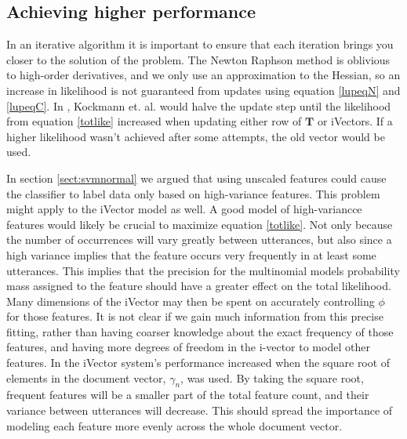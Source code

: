 \subsection{Achieving higher performance}

In an iterative algorithm it is important to ensure that each iteration brings you closer to the solution of the problem. The Newton Raphson method is oblivious to high-order derivatives, and we only use an approximation to the Hessian, so an increase in likelihood is not guaranteed from updates using equation \ref{lupeqN} and \ref{lupeqC}. In \cite{kockmann2010prosodic}, Kockmann et. al. would halve the update step until the likelihood from equation \ref{totlike} increased when updating either row of $\mathbf{T}$ or iVectors. If a higher likelihood wasn't achieved after some attempts, the old vector would be used.  

In section \ref{sect:svmnormal} we argued that using unscaled features could cause the classifier to label data only based on high-variance features. This problem might apply to the iVector model as well. A good model of high-variancce features would likely be crucial to maximize equation \ref{totlike}. Not only because the number of occurrences will vary greatly between utterances, but also since a high variance implies that the feature occurs very frequently in at least some utterances. This implies that the precision for the multinomial models probability mass assigned to the feature should have a greater effect on the total likelihood. Many dimensions of the iVector may then be spent on accurately controlling $\phi$ for those features. It is not clear if we gain much information from this precise fitting, rather than having coarser knowledge about the exact frequency of those features, and having more degrees of freedom in the i-vector to model other features. In \cite{soufifar2011ivector} the iVector system's performance increased when the square root of elements in the document vector, $\gamma_n$, was used. By taking the square root, frequent features will be a smaller part of the total feature count, and their variance between utterances will decrease. This should spread the importance of modeling each feature more evenly across the whole document vector.

